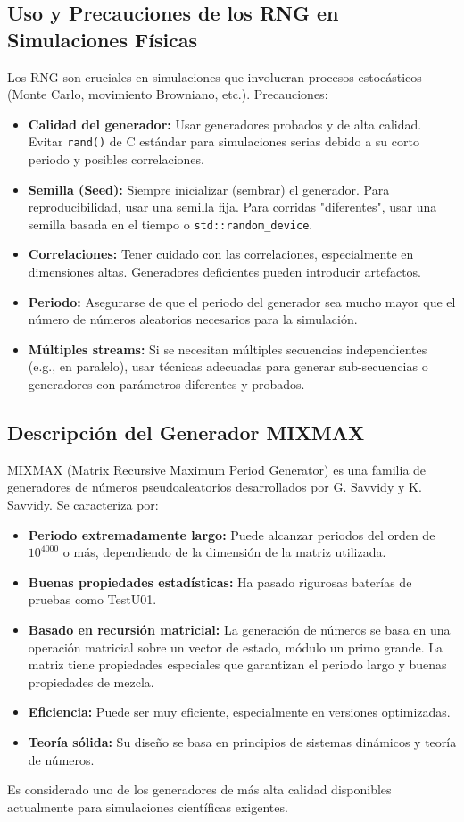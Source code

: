 \documentclass[11pt,a4paper]{article}
\begin{document}
\subsection{Uso y Precauciones de los RNG en Simulaciones Físicas}
Los RNG son cruciales en simulaciones que involucran procesos estocásticos (Monte Carlo, movimiento Browniano, etc.).
Precauciones:
\begin{itemize}
    \item \textbf{Calidad del generador:} Usar generadores probados y de alta calidad. Evitar \texttt{rand()} de C estándar para simulaciones serias debido a su corto periodo y posibles correlaciones.
    \item \textbf{Semilla (Seed):} Siempre inicializar (sembrar) el generador. Para reproducibilidad, usar una semilla fija. Para corridas "diferentes", usar una semilla basada en el tiempo o \texttt{std::random\_device}.
    \item \textbf{Correlaciones:} Tener cuidado con las correlaciones, especialmente en dimensiones altas. Generadores deficientes pueden introducir artefactos.
    \item \textbf{Periodo:} Asegurarse de que el periodo del generador sea mucho mayor que el número de números aleatorios necesarios para la simulación.
    \item \textbf{Múltiples streams:} Si se necesitan múltiples secuencias independientes (e.g., en paralelo), usar técnicas adecuadas para generar sub-secuencias o generadores con parámetros diferentes y probados.
\end{itemize}

\subsection{Descripción del Generador MIXMAX}
MIXMAX (Matrix Recursive Maximum Period Generator) es una familia de generadores de números pseudoaleatorios desarrollados por G. Savvidy y K. Savvidy. Se caracteriza por:
\begin{itemize}
    \item \textbf{Periodo extremadamente largo:} Puede alcanzar periodos del orden de $10^{4000}$ o más, dependiendo de la dimensión de la matriz utilizada.
    \item \textbf{Buenas propiedades estadísticas:} Ha pasado rigurosas baterías de pruebas como TestU01.
    \item \textbf{Basado en recursión matricial:} La generación de números se basa en una operación matricial sobre un vector de estado, módulo un primo grande. La matriz tiene propiedades especiales que garantizan el periodo largo y buenas propiedades de mezcla.
    \item \textbf{Eficiencia:} Puede ser muy eficiente, especialmente en versiones optimizadas.
    \item \textbf{Teoría sólida:} Su diseño se basa en principios de sistemas dinámicos y teoría de números.
\end{itemize}
Es considerado uno de los generadores de más alta calidad disponibles actualmente para simulaciones científicas exigentes.
\end{document}
